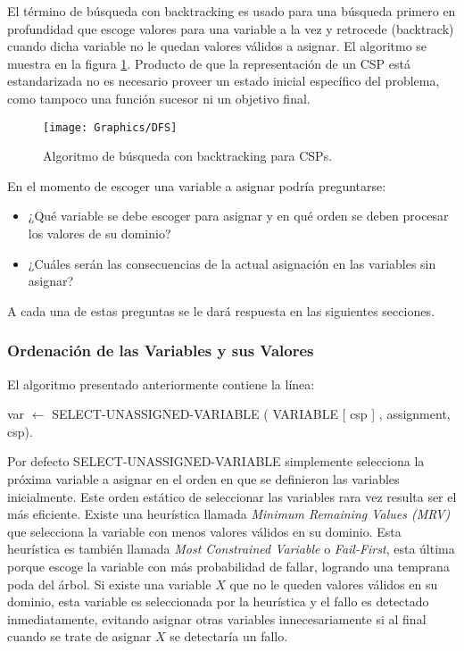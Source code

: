 El t\'ermino de b\'usqueda con backtracking es usado para una b\'usqueda primero en profundidad que escoge valores para una variable a la vez y retrocede (backtrack) cuando dicha variable no le quedan valores v\'alidos a asignar. El algoritmo se muestra en la figura \ref{DFS}. Producto de que la representaci\'on de un CSP est\'a estandarizada no es necesario proveer un estado inicial espec\'ifico del problema, como tampoco una funci\'on sucesor ni un objetivo final.

\begin{figure}
	\begin{center}
		\texttt{[image: Graphics/DFS]}
		\caption{Algoritmo de b\'usqueda con backtracking para CSPs.}
		\label{DFS}
	\end{center}	
\end{figure}

En el momento de escoger una variable a asignar podr\'ia preguntarse:

\begin{itemize}
	\item ¿Qu\'e variable se debe escoger para asignar y en qu\'e orden se deben procesar los valores de su dominio?
	\item ¿Cu\'ales ser\'an las consecuencias de la actual asignaci\'on en las variables sin asignar?
\end{itemize}

A cada una de estas preguntas se le dar\'a respuesta en las siguientes secciones.

\subsubsection{Ordenaci\'on de las Variables y sus Valores}

El algoritmo presentado anteriormente contiene la línea:

\begin{center}
	\scriptsize var $\leftarrow$ SELECT-UNASSIGNED-VARIABLE ( VARIABLE [ csp ] , assignment, csp).
\end{center}

Por defecto SELECT-UNASSIGNED-VARIABLE simplemente selecciona la pr\'oxima variable a asignar en el orden en que se definieron las variables inicialmente. Este orden est\'atico de seleccionar las variables rara vez resulta ser el m\'as eficiente. Existe una heur\'istica llamada \emph{Minimum Remaining Values (MRV)} que selecciona la variable con menos valores v\'alidos en su dominio. Esta heur\'istica es tambi\'en llamada \emph{Most Constrained Variable} o \emph{Fail-First}, esta \'ultima porque escoge la variable con m\'as probabilidad de fallar, logrando una temprana poda del \'arbol. Si existe una variable $X$ que no le queden valores v\'alidos en su dominio, esta variable es seleccionada por la heur\'istica y el fallo es detectado inmediatamente, evitando asignar otras variables innecesariamente si al final cuando se trate de asignar $X$ se detectar\'ia un fallo.

